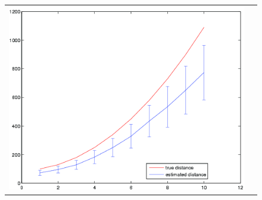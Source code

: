 \documentclass[runningheads]{llncs}
\begin{document}
\begin{figure}[ht]
\begin{tabular}{cc}
\includegraphics[width=.45\linewidth]{resources/figures/errorbar_3q.png}
\end{tabular}
\end{figure}



\end{document}
